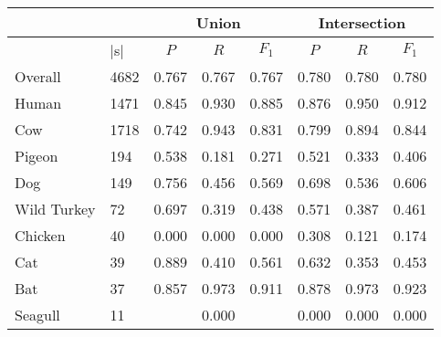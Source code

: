 \begin{table}[t]
\begin{tabular}{llllllll}
\cline{3-8}
 & \multicolumn{1}{l|}{} & \multicolumn{3}{c|}{Union} & \multicolumn{3}{c|}{Intersection} \\ \hline
\multicolumn{1}{|l|}{\Spec{}} & \multicolumn{1}{l|}{$|$\Isol{}s$|$} & \multicolumn{1}{c}{$P$} & \multicolumn{1}{c}{$R$} & \multicolumn{1}{c|}{$F_1$} & \multicolumn{1}{c}{$P$} & \multicolumn{1}{c}{$R$} & \multicolumn{1}{c|}{$F_1$} \\ \hline
\multicolumn{1}{|l|}{Overall} & \multicolumn{1}{l|}{4682} & 0.767 & 0.767 & \multicolumn{1}{l|}{0.767} & 0.780 & 0.780 & \multicolumn{1}{l|}{0.780} \\
\multicolumn{1}{|l|}{Human} & \multicolumn{1}{l|}{1471} & 0.845 & 0.930 & \multicolumn{1}{l|}{0.885} & 0.876 & 0.950 & \multicolumn{1}{l|}{0.912} \\
\multicolumn{1}{|l|}{Cow} & \multicolumn{1}{l|}{1718} & 0.742 & 0.943 & \multicolumn{1}{l|}{0.831} & 0.799 & 0.894 & \multicolumn{1}{l|}{0.844} \\
\multicolumn{1}{|l|}{Pigeon} & \multicolumn{1}{l|}{194} & 0.538 & 0.181 & \multicolumn{1}{l|}{0.271} & 0.521 & 0.333 & \multicolumn{1}{l|}{0.406} \\
\multicolumn{1}{|l|}{Dog} & \multicolumn{1}{l|}{149} & 0.756 & 0.456 & \multicolumn{1}{l|}{0.569} & 0.698 & 0.536 & \multicolumn{1}{l|}{0.606} \\
\multicolumn{1}{|l|}{Wild Turkey} & \multicolumn{1}{l|}{72} & 0.697 & 0.319 & \multicolumn{1}{l|}{0.438} & 0.571 & 0.387 & \multicolumn{1}{l|}{0.461} \\
\multicolumn{1}{|l|}{Chicken} & \multicolumn{1}{l|}{40} & 0.000 & 0.000 & \multicolumn{1}{l|}{0.000} & 0.308 & 0.121 & \multicolumn{1}{l|}{0.174} \\
\multicolumn{1}{|l|}{Cat} & \multicolumn{1}{l|}{39} & 0.889 & 0.410 & \multicolumn{1}{l|}{0.561} & 0.632 & 0.353 & \multicolumn{1}{l|}{0.453} \\
\multicolumn{1}{|l|}{Bat} & \multicolumn{1}{l|}{37} & 0.857 & 0.973 & \multicolumn{1}{l|}{0.911} & 0.878 & 0.973 & \multicolumn{1}{l|}{0.923} \\
\multicolumn{1}{|l|}{Seagull} & \multicolumn{1}{l|}{11} &  & 0.000 & \multicolumn{1}{l|}{} & 0.000 & 0.000 & \multicolumn{1}{l|}{0.000} \\ \hline
\end{tabular}



\label{tab:profile098}
\end{table}